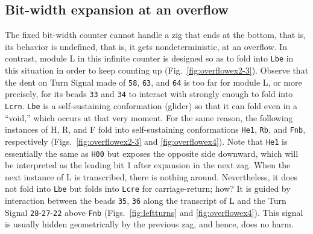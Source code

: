 \documentclass[twocolumn]{svjour3}
\begin{document}
\subsection{Bit-width expansion at an overflow}
The fixed bit-width counter \cite{GeMeScSe2019} cannot handle a zig that ends at the bottom, that is, its behavior is undefined, that is, it gets nondeterministic, at an overflow.
In contrast, module L in this infinite counter is designed so as to fold into \texttt{Lbe} in this situation in order to keep counting up (Fig.~\ref{fig:overflowex2-3}).
Observe that the dent on Turn Signal made of \texttt{58}, \texttt{63}, and \texttt{64} is too far for module L, or more precisely, for its beads \texttt{33} and \texttt{34} to interact with strongly enough to fold into \texttt{Lcrn}.
\texttt{Lbe} is a self-sustaining conformation (glider) so that it can fold even in a ``void,'' which occurs at that very moment.
For the same reason, the following instances of H, R, and F fold into self-sustaining conformations \texttt{He1}, \texttt{Rb}, and \texttt{Fnb}, respectively (Figs.~\ref{fig:overflowex2-3} and \ref{fig:overflowex4}).
Note that \texttt{He1} is essentially the same as \texttt{H00} but exposes the opposite side downward, which will be interpreted as the leading bit 1 after expansion in the next zag.
When the next instance of L is transcribed, there is nothing around.
Nevertheless, it does not fold into \texttt{Lbe} but folds into \texttt{Lcre} for carriage-return; how?
It is guided by interaction between the beads \texttt{35}, \texttt{36} along the transcript of L and the Turn Signal \texttt{28}{-}\texttt{27}{-}\texttt{22} above \texttt{Fnb} (Figs.~\ref{fig:leftturns} and \ref{fig:overflowex4}).
This signal is usually hidden geometrically by the previous zag, and hence, does no harm.
\end{document}
